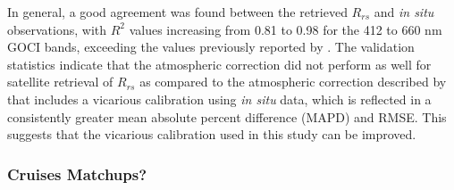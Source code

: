 \documentclass[onecolumn,3p,letterpaper,11pt]{elsarticle}
\begin{document}
In general, a good agreement was found between the retrieved $R_{rs}$ and {\it in situ} observations, with $R^2$ values increasing from 0.81 to 0.98 for the 412 to 660 nm GOCI bands, exceeding the values previously reported by \citet{Ahn2015}. The validation statistics indicate that the atmospheric correction did not perform as well for satellite retrieval of $R_{rs}$ as compared to the atmospheric correction described by \citet{Ahn2015} that includes a vicarious calibration using {\it in situ} data, which is reflected in a consistently greater mean absolute percent difference (MAPD) and RMSE. This suggests that the vicarious calibration used in this study can be improved. 
\subsubsection{Cruises Matchups?}

\end{document}

